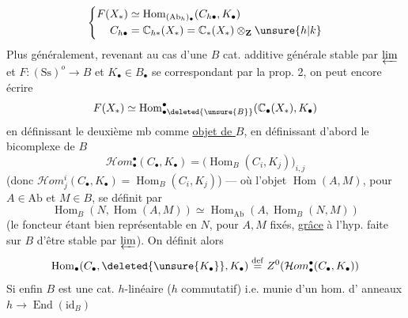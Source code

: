 \[
\left\{\begin{aligned}
F(X_*)&\simeq\operatorname{Hom}_{(\mathrm{Ab}_h)_\bullet}(C_{h\bullet},K_\bullet)\\
C_{h\bullet}&=\mathbb C_{h*}(X_*)=\mathbb C_*(X_*)\otimes_{\mathbf Z}\unsure{h|k}
\end{aligned}\right.
\]
Plus généralement, revenant au cas d'une
$B$ cat. additive générale stable par $\varprojlim$
et $F:(\mathrm{Ss})^o\longrightarrow B$  et $K_\bullet\in B_\bullet$ se correspondant
par la prop. 2, on peut encore
écrire
\[
F(X_*)\simeq\operatorname{Hom}^{\bullet}_{\bullet\deleted{\unsure{B}}}(\mathbb C_\bullet(X_*),K_\bullet)
\]
en définissant le deuxième mb comme
\uline{objet de $B$}, en définissant d'abord le
bicomplexe de $B$
\[
\mathcal Hom^{\bullet}_{\bullet}(C_\bullet,K_\bullet)=
\bigl(\operatorname{Hom}_B(C_i,K_j)\bigr)_{i,j}
\]
(donc $\mathcal Hom^i_j(C_\bullet,K_\bullet)=\operatorname{Hom}_B(C_i,K_j)$)
--- où l'objet $\operatorname{Hom}(A,M)$, pour $A\in\mathrm{Ab}$
et $M\in B$, se définit par
\[
\operatorname{Hom}_B(N,\operatorname{Hom}(A,M))\simeq
\operatorname{Hom}_{\mathrm{Ab}}(A,\operatorname{Hom}_B(N,M))
\]
(le foncteur  étant bien
représentable en $N$, pour $A,M$ fixés, \uline{grâce}
à l'hyp. faite sur $B$ d'être stable par $\varprojlim$).
On définit alors
\[
\operatorname{Hom}_\bullet(C_\bullet,\deleted{\unsure{K_\bullet}},K_\bullet)
\overset{\mathrm{def}}=Z^0(\mathcal Hom^{\bullet}_{\bullet}(C_\bullet,K_\bullet))
\]
Si enfin $B$ est une cat. $h$-linéaire
($h$ commutatif) i.e. munie d'un hom. d'
anneaux $h\longrightarrow\operatorname{End}(\mathrm{id}_B)$
